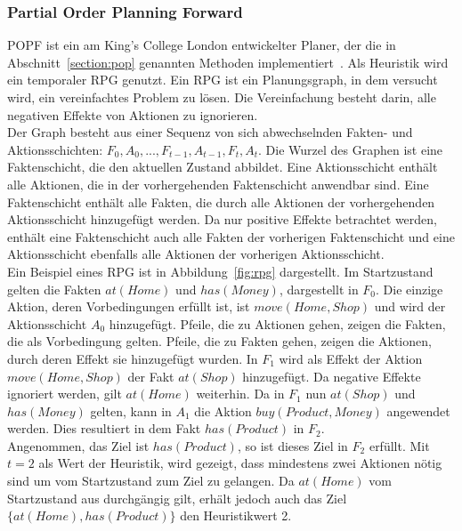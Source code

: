 \subsubsection{Partial Order Planning Forward}
\ac{POPF} ist ein am King’s College London entwickelter Planer, der die in Abschnitt~\ref{section:pop} genannten Methoden implementiert~\citep{popf}.
Als Heuristik wird ein temporaler \acf{RPG} genutzt.
Ein \ac{RPG} ist ein Planungsgraph, in dem versucht wird, ein vereinfachtes Problem zu lösen.
Die Vereinfachung besteht darin, alle negativen Effekte von Aktionen zu ignorieren.\\
Der Graph besteht aus einer Sequenz von sich abwechselnden Fakten- und Aktionsschichten: $F_0, A_0, ..., F_{t-1}, A_{t-1}, F_t, A_t$.
Die Wurzel des Graphen ist eine Faktenschicht, die den aktuellen Zustand abbildet.
Eine Aktionsschicht enthält alle Aktionen, die in der vorhergehenden Faktenschicht anwendbar sind.
Eine Faktenschicht enthält alle Fakten, die durch alle Aktionen der vorhergehenden Aktionsschicht hinzugefügt werden.
Da nur positive Effekte betrachtet werden, enthält eine Faktenschicht auch alle Fakten der vorherigen Faktenschicht und eine Aktionsschicht ebenfalls alle Aktionen der vorherigen Aktionsschicht.\\
Ein Beispiel eines \ac{RPG} ist in Abbildung~\ref{fig:rpg} dargestellt.
Im Startzustand gelten die Fakten $at(Home)$ und $has(Money)$, dargestellt in $F_0$.
Die einzige Aktion, deren Vorbedingungen erfüllt ist, ist $move(Home, Shop)$ und wird der Aktionsschicht $A_0$ hinzugefügt.
Pfeile, die zu Aktionen gehen, zeigen die Fakten, die als Vorbedingung gelten.
Pfeile, die zu Fakten gehen, zeigen die Aktionen, durch deren Effekt sie hinzugefügt wurden.
In $F_1$ wird als Effekt der Aktion $move(Home, Shop)$ der Fakt $at(Shop)$ hinzugefügt.
Da negative Effekte ignoriert werden, gilt $at(Home)$ weiterhin.
Da in $F_1$ nun $at(Shop)$ und $has(Money)$ gelten, kann in $A_1$ die Aktion $buy(Product, Money)$ angewendet werden.
Dies resultiert in dem Fakt $has(Product)$ in $F_2$.\\
Angenommen, das Ziel ist $has(Product)$, so ist dieses Ziel in $F_2$ erfüllt.
Mit $t = 2$ als Wert der Heuristik, wird gezeigt, dass mindestens zwei Aktionen nötig sind um vom Startzustand zum Ziel zu gelangen.
Da $at(Home)$ vom Startzustand aus durchgängig gilt, erhält jedoch auch das Ziel $\{at(Home),has(Product)\}$ den Heuristikwert 2.\\
